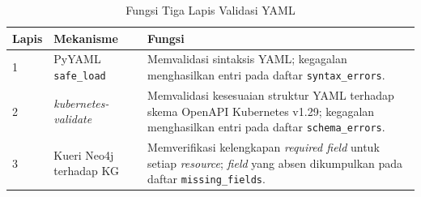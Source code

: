 \renewcommand{\arraystretch}{1.3}
\captionsetup[table]{justification=raggedright,singlelinecheck=false}
\begin{table}[H]
\caption{Fungsi Tiga Lapis Validasi YAML}
\label{tbl:yaml_validation_iv}
\centering
\begin{tabular}{|p{}|p{}|p{}|}
\hline
\textbf{Lapis} & \textbf{Mekanisme} & \textbf{Fungsi} \\
\hline
1 & PyYAML \texttt{safe\_load} & Memvalidasi sintaksis YAML; kegagalan menghasilkan entri pada daftar \texttt{syntax\_errors}. \\
\hline
2 & \textit{kubernetes-validate} & Memvalidasi kesesuaian struktur YAML terhadap skema OpenAPI Kubernetes v1.29; kegagalan menghasilkan entri pada daftar \texttt{schema\_errors}. \\
\hline
3 & Kueri Neo4j terhadap KG & Memverifikasi kelengkapan \textit{required field} untuk setiap \textit{resource}; \textit{field} yang absen dikumpulkan pada daftar \texttt{missing\_fields}. \\
\hline
\end{tabular}
\end{table}
